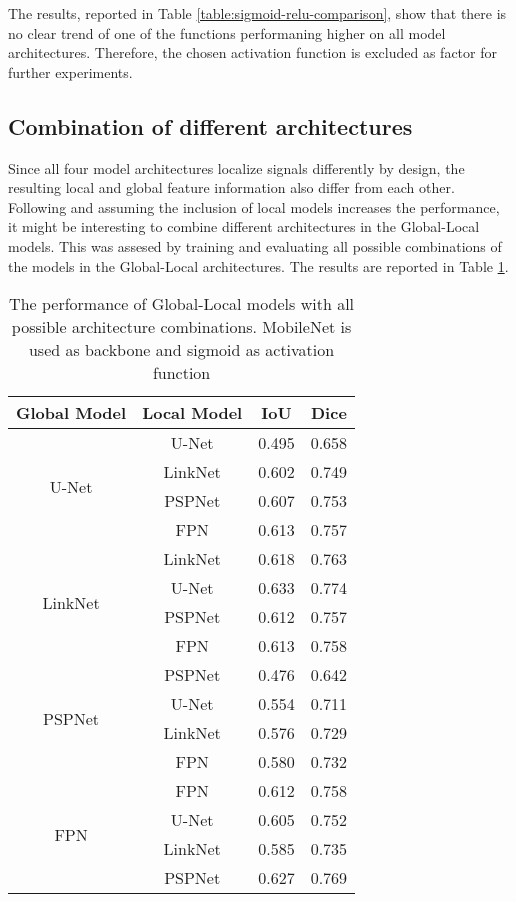 The results, reported in Table \ref{table:sigmoid-relu-comparison}, show that there is no clear trend of one of the functions performaning higher on all model architectures. Therefore, the chosen activation function is excluded as factor for further experiments.

\subsection{Combination of different architectures}

Since all four model architectures localize signals differently by design, the resulting local and global feature information also differ from each other. Following \citeauthor{Oota_2023_WACV} and assuming the inclusion of local models increases the performance, it might be interesting to combine different architectures in the Global-Local models. This was assesed by training and evaluating all possible combinations of the models in the Global-Local architectures. The results are reported in Table \ref{table:global-local-mixed}.

\begin{table}[htb!]
	\centering
	\begin{tabular}{c|c| c| c}
		Global Model & Local Model & IoU & Dice \\ \hline\hline
		\multirow{4}{*}{U-Net} & U-Net & 0.495 & 0.658\\
		 & LinkNet  & 0.602 & 0.749 \\
		 & PSPNet & 0.607 & 0.753 \\
		 & FPN & 0.613 & 0.757 \\\hline
		 \multirow{4}{*}{LinkNet} & LinkNet & 0.618 & 0.763 \\
		 & U-Net  & 0.633 & 0.774 \\
		 & PSPNet & 0.612 & 0.757 \\
		 & FPN & 0.613 & 0.758 \\\hline
		 \multirow{4}{*}{PSPNet} & PSPNet & 0.476 &  0.642\\
		 & U-Net  & 0.554 & 0.711 \\
		 & LinkNet & 0.576 & 0.729 \\
		 & FPN & 0.580 & 0.732 \\\hline
		 \multirow{4}{*}{FPN} & FPN & 0.612 & 0.758 \\
		 & U-Net  & 0.605 & 0.752 \\
		 & LinkNet & 0.585 & 0.735 \\
		 & PSPNet & 0.627 & 0.769 \\\hline
	\end{tabular}
	\caption{The performance of Global-Local models with all possible architecture combinations. MobileNet is used as backbone and sigmoid as activation function}
	\label{table:global-local-mixed}	
\end{table}

